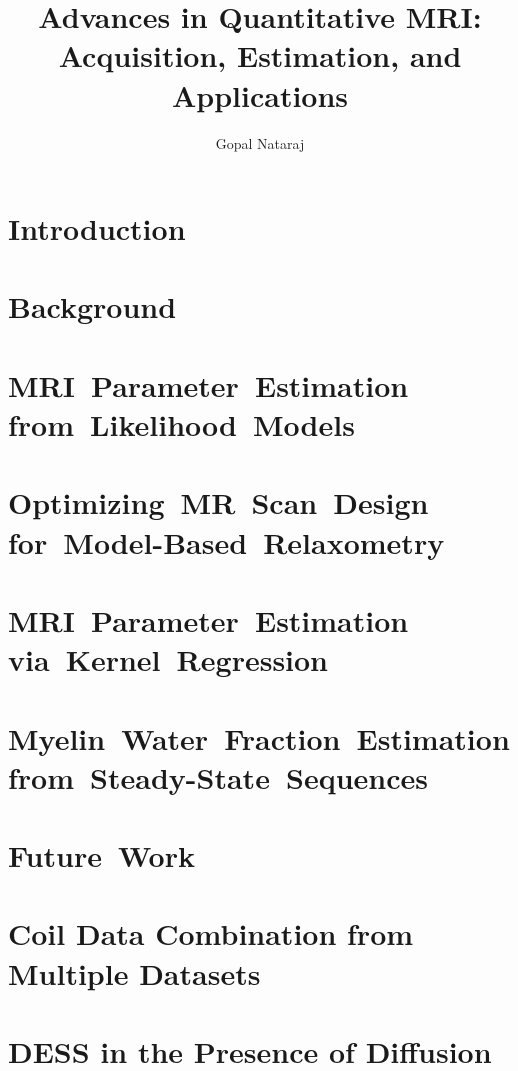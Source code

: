 \documentclass[draft]{../cls/thesis-umich}
\title{
	Advances in Quantitative MRI: \\
	Acquisition,
	Estimation,
	and 
	Applications
}
\author{Gopal Nataraj}
\begin{document}
\chapter{Introduction}
\label{c,intro}


\chapter{Background}
\label{c,bkgrd}


\chapter{MRI~Parameter~Estimation from~Likelihood~Models}
\label{c,relax}


\chapter{Optimizing~MR~Scan~Design for~Model-Based~Relaxometry}
\label{c,scn-dsgn}


\chapter{MRI~Parameter~Estimation via~Kernel~Regression}
\label{c,krr}


\chapter{Myelin~Water~Fraction~Estimation from~Steady-State~Sequences}
\label{c,mwf}


%

\chapter{Future~Work}
\label{c,future}


\appendix
\chapter{Coil Data Combination from Multiple Datasets}
\label{a,cc-multi}


\chapter{DESS in the Presence of Diffusion}
\label{a,dess-diff}




\end{document}
